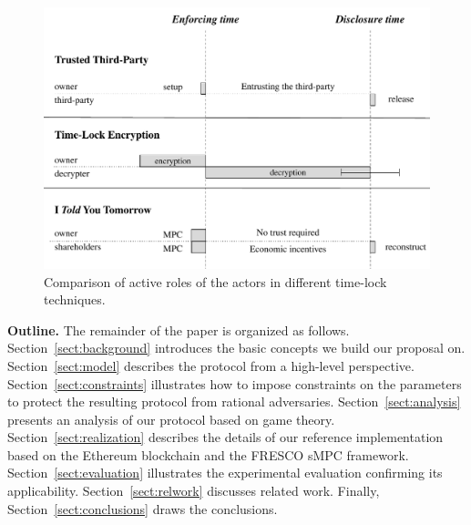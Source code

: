 \begin{figure}[t]
	\centering
	\includegraphics[width=\textwidth]{fig/models}
	\caption{Comparison of active roles of the actors in different time-lock techniques.}
	\label{fig:models}
\end{figure}


\medskip\textbf{Outline.} The remainder of the paper is organized as follows.
%
Section~\ref{sect:background} introduces the basic concepts we build our proposal on. 
%
Section~\ref{sect:model} describes the \shortname protocol from a high-level perspective.
%
Section~\ref{sect:constraints} illustrates how to impose constraints on the parameters to protect the resulting protocol from rational adversaries.
%
Section~\ref{sect:analysis} presents an analysis of our protocol based on game theory.
%
Section~\ref{sect:realization} describes the details of our reference implementation based on the Ethereum blockchain and the FRESCO sMPC framework.
%
Section~\ref{sect:evaluation} illustrates the experimental evaluation confirming its applicability.
%
Section~\ref{sect:relwork} discusses related work.
%
Finally, Section~\ref{sect:conclusions} draws the conclusions.
